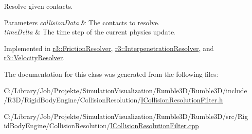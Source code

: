 Resolve given contacts. 


\begin{DoxyParams}{Parameters}
{\em collision\+Data} & The contacts to resolve. \\
\hline
{\em time\+Delta} & The time step of the current physics update. \\
\hline
\end{DoxyParams}


Implemented in \mbox{\hyperlink{classr3_1_1_friction_resolver_af26a84959e95749088f713176ec3c096}{r3\+::\+Friction\+Resolver}}, \mbox{\hyperlink{classr3_1_1_interpenetration_resolver_a7c896a7e8e0321c9f26b3d9c616d16ee}{r3\+::\+Interpenetration\+Resolver}}, and \mbox{\hyperlink{classr3_1_1_velocity_resolver_a93e8859d1ab3407b073328a58b7caeef}{r3\+::\+Velocity\+Resolver}}.



The documentation for this class was generated from the following files\+:\begin{DoxyCompactItemize}
\item 
C\+:/\+Library/\+Job/\+Projekte/\+Simulation\+Visualization/\+Rumble3\+D/\+Rumble3\+D/include/\+R3\+D/\+Rigid\+Body\+Engine/\+Collision\+Resolution/\mbox{\hyperlink{_i_collision_resolution_filter_8h}{I\+Collision\+Resolution\+Filter.\+h}}\item 
C\+:/\+Library/\+Job/\+Projekte/\+Simulation\+Visualization/\+Rumble3\+D/\+Rumble3\+D/src/\+Rigid\+Body\+Engine/\+Collision\+Resolution/\mbox{\hyperlink{_i_collision_resolution_filter_8cpp}{I\+Collision\+Resolution\+Filter.\+cpp}}\end{DoxyCompactItemize}
